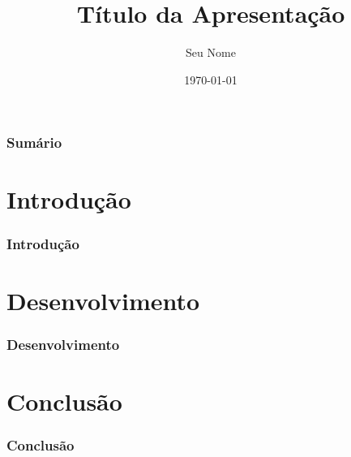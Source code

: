 \documentclass{beamer}
\title{Título da Apresentação}
\author{Seu Nome}
\date{\today}
\begin{document}
\frame{\titlepage}

\begin{frame}
\frametitle{Sumário}
\tableofcontents
\end{frame}

\section{Introdução}
\begin{frame}
\frametitle{Introdução}
\lipsum[1-2]
\end{frame}

\section{Desenvolvimento}
\begin{frame}
\frametitle{Desenvolvimento}
\lipsum[3-4]
\end{frame}

\section{Conclusão}
\begin{frame}
\frametitle{Conclusão}
\lipsum[5]
\end{frame}
\end{document}
